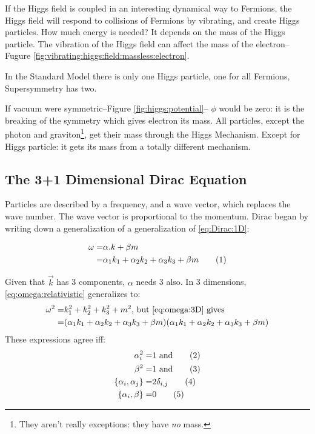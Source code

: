 \documentclass[]{article}
\newcommand\numberthis{\addtocounter{equation}{1}\tag{\theequation}}
\begin{document}
If the Higgs field is coupled in an interesting dynamical way to Fermions, the Higgs field will respond to collisions of Fermions by vibrating, and create Higgs particles. How much energy is needed? It depends on the mass of the Higgs particle. The vibration of the Higgs field can affect the mass of the electron--Fugure \ref{fig:vibrating:higgs:field:massless:electron}.

In the Standard Model there is only one Higgs particle, one for all Fermions, Supersymmetry has two.

If vacuum were symmetric--Figure \ref{fig:higgs:potential}-- $\phi$ would be zero: it is the breaking of the symmetry which gives electron its mass. All particles, except the photon and graviton\footnote{They aren't really exceptions: they have \emph{no} mass.}, get their mass through the Higgs Mechanism. Except for Higgs particle: it gets its mass from a totally different mechanism.

\subsection{The 3+1 Dimensional Dirac Equation}

Particles are described by a frequency, and a wave vector, which replaces the wave number. The wave vector is proportional to the momentum. Dirac began by writing down a generalization of a generalization of \eqref{eq:Dirac:1D}:

\begin{align*}
	\omega =& \alpha . k+\beta m\\
	=& \alpha_1 k_1 + \alpha_2 k_2 + \alpha_3 k_3 +\beta m \numberthis \label{eq:omega:3D}
\end{align*}

Given that $\vec{k}$ has 3 components, $\alpha$ needs 3 also. In 3 dimensions, \eqref{eq:omega:relativistic} generalizes to:
\begin{align*}
	\omega^2 =& k_1^2 + k_2^2 +k_3^2 +m^2 \text{, but \eqref{eq:omega:3D} gives}\\
	=& (\alpha_1 k_1 + \alpha_2 k_2 + \alpha_3 k_3 +\beta m)(\alpha_1 k_1 + \alpha_2 k_2 + \alpha_3 k_3 +\beta m)
\end{align*}
These expressions agree iff:
\begin{align*}
	\alpha_i^2 =& 1  \text{ and} \numberthis \label{eq:dirac:ac1}\\
	\beta^2 =& 1 \text{ and} \numberthis \label{eq:dirac:ac2}\\
	\{\alpha_i,\alpha_j\} =& 2 \delta_{i,j} \numberthis \label{eq:dirac:ac3}\\
	\{\alpha_i,\beta\} =& 0 \numberthis \label{eq:dirac:ac4}
\end{align*}
\end{document}
